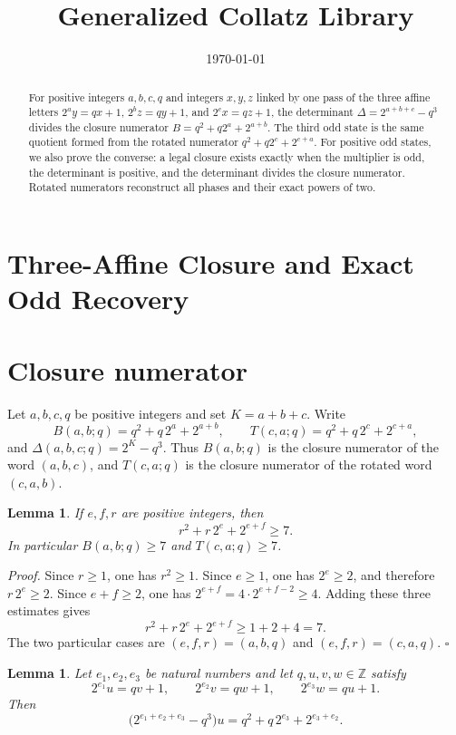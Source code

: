 \documentclass[11pt,letterpaper]{article}
\title{Generalized Collatz Library}
\author{}
\date{\today}
\newcommand{\Z}{\mathbb{Z}}
\newtheorem{lemma}[theorem]{Lemma}
\newenvironment{proof}{\noindent\textit{Proof.}}{\hfill\(\square\)}
\begin{document}
\maketitle
\section*{Three-Affine Closure and Exact Odd Recovery}

\begin{abstract}
For positive integers \(a,b,c,q\) and integers \(x,y,z\) linked by one pass of the three affine letters \(2^{a}y=qx+1\), \(2^{b}z=qy+1\), and \(2^{c}x=qz+1\), the determinant \(\Delta=2^{a+b+c}-q^{3}\) divides the closure numerator \(B=q^{2}+q2^{a}+2^{a+b}\). The third odd state is the same quotient formed from the rotated numerator \(q^{2}+q2^{c}+2^{c+a}\). For positive odd states, we also prove the converse: a legal closure exists exactly when the multiplier is odd, the determinant is positive, and the determinant divides the closure numerator. Rotated numerators reconstruct all phases and their exact powers of two.
\end{abstract}

\section{Closure numerator}

Let \(a,b,c,q\) be positive integers and set \(K=a+b+c\). Write
\[
B(a,b;q)=q^{2}+q\,2^{a}+2^{a+b},
\qquad
T(c,a;q)=q^{2}+q\,2^{c}+2^{c+a},
\]
and \(\Delta(a,b,c;q)=2^{K}-q^{3}\). Thus \(B(a,b;q)\) is the closure numerator of the word \((a,b,c)\), and \(T(c,a;q)\) is the closure numerator of the rotated word \((c,a,b)\).

\begin{lemma}
\label{lem:numerator-seven}
If \(e,f,r\) are positive integers, then
\[
r^{2}+r\,2^{e}+2^{e+f}\ge 7.
\]
In particular \(B(a,b;q)\ge 7\) and \(T(c,a;q)\ge 7\).
\end{lemma}

\begin{proof}
Since \(r\ge 1\), one has \(r^{2}\ge 1\). Since \(e\ge 1\), one has \(2^{e}\ge 2\), and therefore \(r\,2^{e}\ge 2\). Since \(e+f\ge 2\), one has \(2^{e+f}=4\cdot 2^{e+f-2}\ge 4\). Adding these three estimates gives
\[
r^{2}+r\,2^{e}+2^{e+f}\ge 1+2+4=7.
\]
The two particular cases are \((e,f,r)=(a,b,q)\) and \((e,f,r)=(c,a,q)\).
\end{proof}

\begin{lemma}
\label{lem:identity}
Let \(e_{1},e_{2},e_{3}\) be natural numbers and let \(q,u,v,w\in\Z\) satisfy
\[
2^{e_{1}}u=qv+1,
\qquad
2^{e_{2}}v=qw+1,
\qquad
2^{e_{3}}w=qu+1.
\]
Then
\[
\bigl(2^{e_{1}+e_{2}+e_{3}}-q^{3}\bigr)u
  =q^{2}+q\,2^{e_{3}}+2^{e_{3}+e_{2}}.
\]
\end{lemma}
\end{document}

